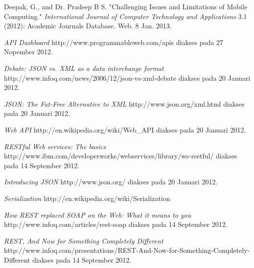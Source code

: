 \documentclass[a4paper, 12pt]{report}
\begin{document}
\begin{thebibliography}{99}
\singlespacing 


Deepak, G., and Dr. Pradeep B S. "Challenging Issues and Limitations of Mobile Computing."
  \emph{International Journal of Computer Technology and Applications} 3.1 (2012): Academic Journals Database. Web. 8 Jan. 2013.

  \emph{API Dashboard}
  http://www.programmableweb.com/apis
  diakses pada 27 Nopember 2012.
  
  \emph{Debate: JSON vs. XML as a data interchange format}
  http://www.infoq.com/news/2006/12/json-vs-xml-debate
  diakses pada 20 Januari 2012.
  
  \emph{JSON: The Fat-Free Alternative to XML}
  http://www.json.org/xml.html
  diakses pada 20 Januari 2012.
  
  \emph{Web API}
  http://en.wikipedia.org/wiki/Web\_API
  diakses pada 20 Januari 2012.

  \emph{RESTful Web services: The basics}
  \\http://www.ibm.com/developerworks/webservices/library/ws-restful/
  diakses pada 14 September 2012.

  \emph{Introducing JSON} http://www.json.org/
  diakses pada 20 Januari 2012.

  \emph{Serialization} http://en.wikipedia.org/wiki/Serialization
  
  \emph{How REST replaced SOAP on the Web: What it means to you}
  http://www.infoq.com/articles/rest-soap
  diakses pada 14 September 2012.
  
  \emph{REST, And Now for Something Completely Different}
  http://www.infoq.com/presentations/REST-And-Now-for-Something-Completely-Different
  diakses pada 14 September 2012.
 
\end{thebibliography}
\end{document}
